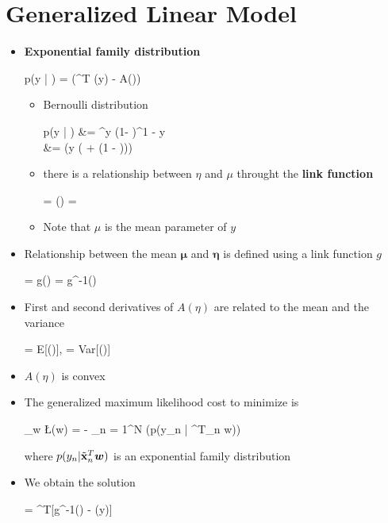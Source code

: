 \section{Generalized Linear Model}
\begin{itemize}
	\item \textbf{Exponential family distribution}
	\begin{myalign*}
	    p(\*y | \bm \eta) =  \exp(\bm \eta^T \bm \phi(\*y) - A(\bm \eta))
	\end{myalign*}
	\begin{itemize}
		\item Bernoulli distribution
		\begin{myalign*}
		    p(y | \mu) &= \mu^y (1- \mu)^{1 - y}\\
		    &= \exp(y \log( + \log(1 - \mu)))
		\end{myalign*}
		\item there is a relationship between $\eta$ and $\mu$ throught the \textbf{link function}
		\begin{myalign*}
		    \eta = \log() \leftrightarrow \mu = \frac{e^{\eta}}{1 + e^{\eta}}
		\end{myalign*}
		\item Note that $\mu$ is the mean parameter of $y$
	\end{itemize}
	\item Relationship between the mean $\bm \mu$ and $\bm \eta$ is defined using a link function $g$
	\begin{myalign*}
	    \bm \eta = \*g(\bm \mu) \Leftrightarrow \bm \mu = \*g^{-1}(\bm \eta)
	\end{myalign*}
	\item First and second derivatives of $A(\eta)$ are related to the mean and the variance
	\begin{myalign*}
	     = E[\bm \phi(\eta)], \hspace{4pt}  = Var[\bm \phi(\eta)]
	\end{myalign*}
	\item $A(\eta)$ is convex
	\item The generalized maximum likelihood cost to minimize is
	\begin{myalign*}
	    \min_{\bm w} \L(\bm w) = - \sum_{n = 1}^N \log(p(y_n | ^T_n \bm w))
	\end{myalign*}
	where $p(y_n | \tilde{\mathbf{x}}^T_n \bm w)$ is an exponential family distribution
	\item We obtain the solution
	\begin{myalign*}
	     = ^T[\*g^{-1}(\bm \eta) - \bm \phi(\*y)]
	\end{myalign*}
\end{itemize}

